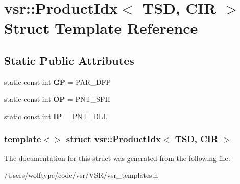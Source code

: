 \hypertarget{structvsr_1_1_product_idx_3_01_t_s_d_00_01_c_i_r_01_4}{\section{vsr\-:\-:Product\-Idx$<$ T\-S\-D, C\-I\-R $>$ Struct Template Reference}
\label{structvsr_1_1_product_idx_3_01_t_s_d_00_01_c_i_r_01_4}
}
\subsection*{Static Public Attributes}
\begin{DoxyCompactItemize}
\item 
\hypertarget{structvsr_1_1_product_idx_3_01_t_s_d_00_01_c_i_r_01_4_a28904cd2fe204c85b31d944bb82c2d7a}{static const int {\bfseries G\-P} = P\-A\-R\-\_\-\-D\-F\-P}\label{structvsr_1_1_product_idx_3_01_t_s_d_00_01_c_i_r_01_4_a28904cd2fe204c85b31d944bb82c2d7a}

\item 
\hypertarget{structvsr_1_1_product_idx_3_01_t_s_d_00_01_c_i_r_01_4_a7029b9ff7784e5e08b8a3333d400684a}{static const int {\bfseries O\-P} = P\-N\-T\-\_\-\-S\-P\-H}\label{structvsr_1_1_product_idx_3_01_t_s_d_00_01_c_i_r_01_4_a7029b9ff7784e5e08b8a3333d400684a}

\item 
\hypertarget{structvsr_1_1_product_idx_3_01_t_s_d_00_01_c_i_r_01_4_abf3434bacce512a140c2a63c76bfdff5}{static const int {\bfseries I\-P} = P\-N\-T\-\_\-\-D\-L\-L}\label{structvsr_1_1_product_idx_3_01_t_s_d_00_01_c_i_r_01_4_abf3434bacce512a140c2a63c76bfdff5}

\end{DoxyCompactItemize}
\subsubsection*{template$<$$>$ struct vsr\-::\-Product\-Idx$<$ T\-S\-D, C\-I\-R $>$}



The documentation for this struct was generated from the following file\-:\begin{DoxyCompactItemize}
\item 
/\-Users/wolftype/code/vsr/\-V\-S\-R/vsr\-\_\-templates.\-h\end{DoxyCompactItemize}
